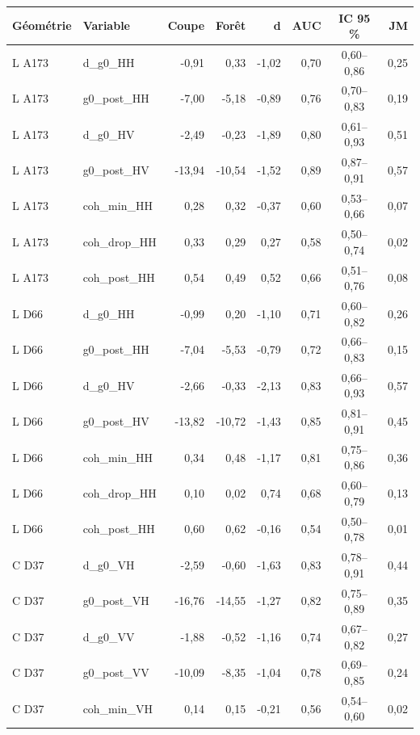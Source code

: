 \begin{tabular}{llrrrrcr}
\toprule
Géométrie & Variable & Coupe & Forêt & d & AUC & IC 95 \% & JM \\
\midrule
L A173 & d\_g0\_HH & -0{,}91 & 0{,}33 & -1{,}02 & 0{,}70 & 0{,}60--0{,}86 & 0{,}25 \\
L A173 & g0\_post\_HH & -7{,}00 & -5{,}18 & -0{,}89 & 0{,}76 & 0{,}70--0{,}83 & 0{,}19 \\
L A173 & d\_g0\_HV & -2{,}49 & -0{,}23 & -1{,}89 & 0{,}80 & 0{,}61--0{,}93 & 0{,}51 \\
L A173 & g0\_post\_HV & -13{,}94 & -10{,}54 & -1{,}52 & 0{,}89 & 0{,}87--0{,}91 & 0{,}57 \\
L A173 & coh\_min\_HH & 0{,}28 & 0{,}32 & -0{,}37 & 0{,}60 & 0{,}53--0{,}66 & 0{,}07 \\
L A173 & coh\_drop\_HH & 0{,}33 & 0{,}29 & 0{,}27 & 0{,}58 & 0{,}50--0{,}74 & 0{,}02 \\
L A173 & coh\_post\_HH & 0{,}54 & 0{,}49 & 0{,}52 & 0{,}66 & 0{,}51--0{,}76 & 0{,}08 \\
L D66 & d\_g0\_HH & -0{,}99 & 0{,}20 & -1{,}10 & 0{,}71 & 0{,}60--0{,}82 & 0{,}26 \\
L D66 & g0\_post\_HH & -7{,}04 & -5{,}53 & -0{,}79 & 0{,}72 & 0{,}66--0{,}83 & 0{,}15 \\
L D66 & d\_g0\_HV & -2{,}66 & -0{,}33 & -2{,}13 & 0{,}83 & 0{,}66--0{,}93 & 0{,}57 \\
L D66 & g0\_post\_HV & -13{,}82 & -10{,}72 & -1{,}43 & 0{,}85 & 0{,}81--0{,}91 & 0{,}45 \\
L D66 & coh\_min\_HH & 0{,}34 & 0{,}48 & -1{,}17 & 0{,}81 & 0{,}75--0{,}86 & 0{,}36 \\
L D66 & coh\_drop\_HH & 0{,}10 & 0{,}02 & 0{,}74 & 0{,}68 & 0{,}60--0{,}79 & 0{,}13 \\
L D66 & coh\_post\_HH & 0{,}60 & 0{,}62 & -0{,}16 & 0{,}54 & 0{,}50--0{,}78 & 0{,}01 \\
C D37 & d\_g0\_VH & -2{,}59 & -0{,}60 & -1{,}63 & 0{,}83 & 0{,}78--0{,}91 & 0{,}44 \\
C D37 & g0\_post\_VH & -16{,}76 & -14{,}55 & -1{,}27 & 0{,}82 & 0{,}75--0{,}89 & 0{,}35 \\
C D37 & d\_g0\_VV & -1{,}88 & -0{,}52 & -1{,}16 & 0{,}74 & 0{,}67--0{,}82 & 0{,}27 \\
C D37 & g0\_post\_VV & -10{,}09 & -8{,}35 & -1{,}04 & 0{,}78 & 0{,}69--0{,}85 & 0{,}24 \\
C D37 & coh\_min\_VH & 0{,}14 & 0{,}15 & -0{,}21 & 0{,}56 & 0{,}54--0{,}60 & 0{,}02 \\

\end{tabular}
